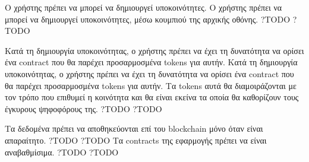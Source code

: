 \begin{enumerate}[label=\textbf{<ΛΑ-\arabic*>}, leftmargin=\parindent, align=left, labelwidth=\parindent, labelsep=0pt]
	\sysReqItem
		{Ο χρήστης πρέπει να μπορεί να δημιουργεί υποκοινότητες.}
		{Ο χρήστης πρέπει να μπορεί να δημιουργεί υποκοινότητες, μέσω κουμπιού της αρχικής οθόνης.}
		{?}{TODO}
		{?}{TODO}	

	\sysReqItem
		{Κατά τη δημιουργία υποκοινότητας, ο χρήστης πρέπει να έχει τη δυνατότητα να ορίσει ένα contract που θα παρέχει προσαρμοσμένα tokens για αυτήν.}
		{Κατά τη δημιουργία υποκοινότητας, ο χρήστης πρέπει να έχει τη δυνατότητα να ορίσει ένα contract που θα παρέχει προσαρμοσμένα tokens για αυτήν. Τα tokens αυτά θα διαμοιράζονται με τον τρόπο που επιθυμεί η κοινότητα και θα είναι εκείνα τα οποία θα καθορίζουν τους έγκυρους ψηφοφόρους της.}
		{?}{TODO}
		{?}{TODO}
\end{enumerate}

\begin{enumerate}[label=\textbf{<ΜΛΑ-\arabic*>}, leftmargin=\parindent, align=left, labelwidth=\parindent, labelsep=0pt]
	\sysReqItem
		{Τα δεδομένα πρέπει να αποθηκεύονται επί του blockchain μόνο όταν είναι απαραίτητο.}
		{}
		{?}{TODO}
		{?}{TODO}
	\sysReqItem
		{Τα contracts της εφαρμογής πρέπει να είναι αναβαθμίσιμα.}
		{}
		{?}{TODO}
		{?}{TODO}
\end{enumerate}


